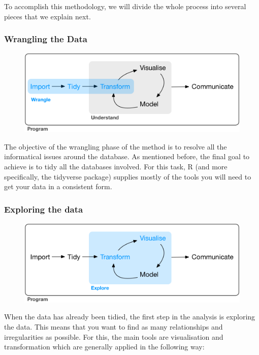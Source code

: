 \documentclass[]{book}
\begin{document}
To accomplish this methodology, we will divide the whole process into
several pieces that we explain next.

\subsubsection{Wrangling the Data}\label{wrangling-the-data}

\begin{figure}
\centering
\includegraphics{diagrams/data-science-wrangle.png}
\caption{}
\end{figure}

The objective of the wrangling phase of the method is to resolve all the
informatical issues around the database. As mentioned before, the final
goal to achieve is to tidy all the databases involved. For this task, R
(and more specifically, the tidyverse package) supplies mostly of the
tools you will need to get your data in a consistent form.

\subsubsection{Exploring the data}\label{exploring-the-data}

\begin{figure}
\centering
\includegraphics{diagrams/data-science-explore.png}
\caption{}
\end{figure}

When the data has already been tidied, the first step in the analysis is
exploring the data. This means that you want to find as many
relationships and irregularities as possible. For this, the main tools
are visualisation and transformation which are generally applied in the
following way:
\end{document}
